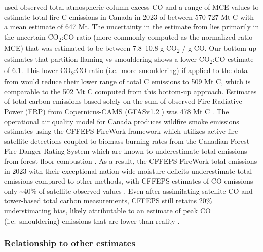 \documentclass[, manuscript]{copernicus}
\begin{document}
\citet{byrneCarbonEmissions20232024} used observed total atmospheric
column excess CO and a range of MCE values to estimate total fire C
emissions in Canada in 2023 of between 570-727 Mt C with a mean estimate
of 647 Mt. The uncertainty in the estimate from
\citet{byrneCarbonEmissions20232024} lies primarily in the uncertain
CO\textsubscript{2}:CO ratio (more commonly computed as the normalized
ratio MCE) that was estimated to be between 7.8--10.8 g
CO\textsubscript{2} / g CO. Our bottom-up estimates that partition
flaming vs smouldering shows a lower CO\textsubscript{2}:CO estimate of
6.1. This lower CO\textsubscript{2}:CO ratio (i.e.~more smouldering) if
applied to the data from \citet{byrneCarbonEmissions20232024} would
reduce their lower range of total C emissions to 509 Mt C, which is
comparable to the 502 Mt C computed from this bottom-up approach.
Estimates of total carbon emissions based solely on the sum of observed
Fire Radiative Power (FRP) from Copernicus-CAMS (GFASv1.2
\citep{kaiserBiomassBurningEmissions2012}) was 478 Mt C
\citep{jonesStateWildfires202320242024}. The operational air quality
model for Canada produces wildfire smoke emissions estimates using the
CFFEPS-FireWork framework \citep{chen2019} which utilizes active fire
satellite detections coupled to biomass burning rates from the Canadian
Forest Fire Danger Rating System which are known to underestimate total
emissions from forest floor combustion \citep{degroot2009}. As a result,
the CFFEPS-FireWork total emissions in 2023 with their exceptional
nation-wide moisture deficits
\citep{jainDriversImpactsRecordBreaking2024} underestimate total
emissions compared to other methods, with CFFEPS estimates of CO
emissions only \textasciitilde40\% of satellite observed values
\citep{griffinBiomassBurningCO2024, voshtaniQuantifyingCOEmissions2025}.
Even after assimilating satellite CO and tower-based total carbon
measurements, CFFEPS still retains 20\% understimating bias, likely
attributable to an estimate of peak CO (i.e.~smouldering) emissions that
are lower than reality \citep{voshtaniQuantifyingCOEmissions2025}.

\subsubsection{Relationship to other estimates}
\end{document}
